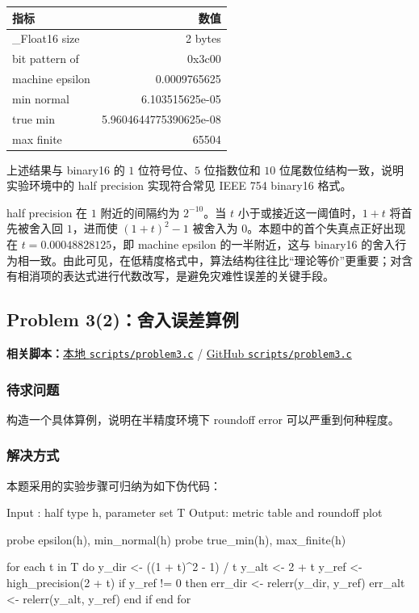 \documentclass[12pt,a4paper,fontset=none]{ctexart}
\newcommand{\blocktitle}[1]{\subsubsection{#1}}
\newcommand{\codeinline}[1]{{\normalfont #1}}
\newcommand{\fileinline}[1]{{\urlstyle{same}\nolinkurl{#1}}}
\newcommand{\scriptpath}[1]{\fileinline{#1}}
\newcommand{\githubscriptsbase}{https://github.com/Void0312Aurora/computational-physics-homework-2026/blob/main/03/scripts}
\newcommand{\scriptlink}[1]{\noindent\textbf{相关脚本：}\href{../../../scripts/#1}{本地 \scriptpath{scripts/#1}} / \href{\githubscriptsbase/#1}{GitHub \scriptpath{scripts/#1}}\par\medskip}
\newcounter{none}
\begin{document}
{\def\LTcaptype{none} %
\begin{longtable}[]{@{}lr@{}}
\toprule\noalign{}
指标 & 数值 \\
\midrule\noalign{}
\endhead
\bottomrule\noalign{}
\endlastfoot
\codeinline{\_Float16} size & 2 bytes \\
bit pattern of \codeinline{1.0} & \codeinline{0x3c00} \\
machine epsilon & 0.0009765625 \\
min normal & 6.103515625e-05 \\
true min & 5.9604644775390625e-08 \\
max finite & 65504 \\
\end{longtable}
}

上述结果与 binary16 的 \(1\) 位符号位、\(5\) 位指数位和 \(10\) 位尾数位结构一致，说明实验环境中的 half precision 实现符合常见 IEEE 754 binary16 格式。

half precision 在 \(1\) 附近的间隔约为 \(2^{-10}\)。当 \(t\) 小于或接近这一阈值时，\(1+t\) 将首先被舍入回 \(1\)，进而使 \((1+t)^2-1\) 被舍入为 \(0\)。本题中的首个失真点正好出现在 \(t=0.00048828125\)，即 machine epsilon 的一半附近，这与 binary16 的舍入行为相一致。由此可见，在低精度格式中，算法结构往往比``理论等价''更重要；对含有相消项的表达式进行代数改写，是避免灾难性误差的关键手段。

\subsection{Problem 3(2)：舍入误差算例}\label{problem-32ux820dux5165ux8befux5deeux7b97ux4f8b}

\scriptlink{problem3.c}

\blocktitle{待求问题}

构造一个具体算例，说明在半精度环境下 roundoff error 可以严重到何种程度。

\blocktitle{解决方式}

本题采用的实验步骤可归纳为如下伪代码：

\begin{CodeBlock}
Input : half type h, parameter set T
Output: metric table and roundoff plot

probe epsilon(h), min_normal(h)
probe true_min(h), max_finite(h)

for each t in T do
    y_dir <- ((1 + t)^2 - 1) / t
    y_alt <- 2 + t
    y_ref <- high_precision(2 + t)
    if y_ref != 0 then
        err_dir <- relerr(y_dir, y_ref)
        err_alt <- relerr(y_alt, y_ref)
    end if
end for
\end{CodeBlock}
\end{document}
